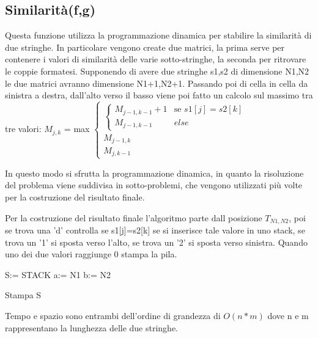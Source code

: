 \documentclass[a4paper,10pt]{article}
\begin{document}
\subsection{Similarità(f,g)}
Questa funzione utilizza la programmazione dinamica per stabilire la similarità di due stringhe. In particolare vengono create due matrici, la prima serve per contenere i valori di similarità delle varie sotto-stringhe, la seconda per ritrovare le coppie formatesi.
Supponendo di avere due stringhe s1,s2 di dimensione N1,N2 le due matrici avranno dimensione N1+1,N2+1.
Passando poi di cella in cella da sinistra a destra, dall'alto verso il basso viene poi fatto un calcolo sul massimo tra tre valori:
$M_{j,k}$ = max $\left\{\begin{array}{l}\left\{\begin{array}{ll}M_{j-1,k-1}+1 & \mbox{se }s1[j]=s2[k]\\M_{j-1,k-1} & else\end{array}\right.\\M_{j-1,k}\\M_{j,k-1}\end{array}\right.$

In questo modo si sfrutta la programmazione dinamica, in quanto la risoluzione del problema viene suddivisa in sotto-problemi, che vengono utilizzati più volte per la costruzione del risultato finale.

Per la costruzione del risultato finale l'algoritmo parte dall posizione $T_{N1,N2}$, poi se trova una 'd' controlla se s1[j]=s2[k] se si inserisce tale valore in uno stack, se trova un '1' si sposta verso l'alto, se trova un '2' si sposta verso sinistra. Quando uno dei due valori raggiunge 0 stampa la pila.

\begin{algorithm}[H]

S:= STACK\;
a:= N1\;
b:= N2\;

Stampa S\;
\end{algorithm}
Tempo e spazio sono entrambi dell'ordine di grandezza di $O(n*m)$ dove n e m rappresentano la lunghezza delle due stringhe.
\end{document}
